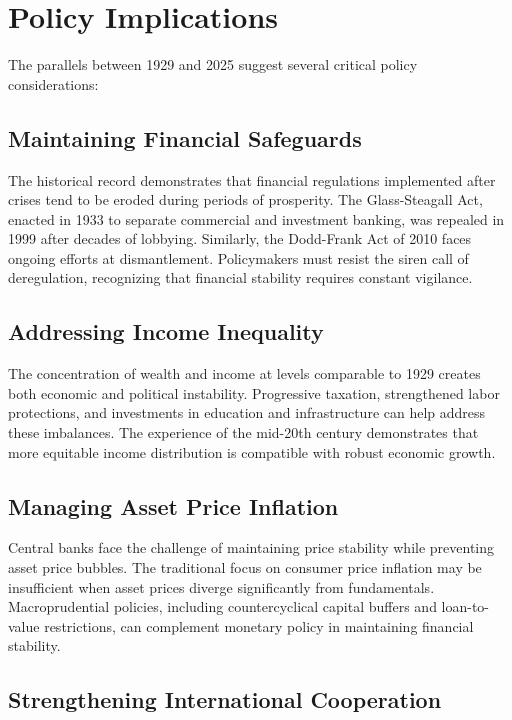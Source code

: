 \documentclass[12pt,letterpaper]{article}
\begin{document}
\section{Policy Implications}

The parallels between 1929 and 2025 suggest several critical policy considerations:

\subsection{Maintaining Financial Safeguards}

The historical record demonstrates that financial regulations implemented after crises tend to be eroded during periods of prosperity. The Glass-Steagall Act, enacted in 1933 to separate commercial and investment banking, was repealed in 1999 after decades of lobbying. Similarly, the Dodd-Frank Act of 2010 faces ongoing efforts at dismantlement. Policymakers must resist the siren call of deregulation, recognizing that financial stability requires constant vigilance.

\subsection{Addressing Income Inequality}

The concentration of wealth and income at levels comparable to 1929 creates both economic and political instability. Progressive taxation, strengthened labor protections, and investments in education and infrastructure can help address these imbalances. The experience of the mid-20th century demonstrates that more equitable income distribution is compatible with robust economic growth.

\subsection{Managing Asset Price Inflation}

Central banks face the challenge of maintaining price stability while preventing asset price bubbles. The traditional focus on consumer price inflation may be insufficient when asset prices diverge significantly from fundamentals. Macroprudential policies, including countercyclical capital buffers and loan-to-value restrictions, can complement monetary policy in maintaining financial stability.

\subsection{Strengthening International Cooperation}
\end{document}
